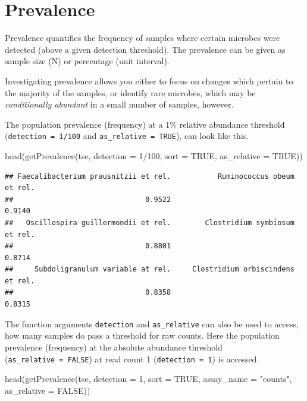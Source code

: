 \documentclass[
]{book}
\newenvironment{Shaded}{\begin{snugshade}}{\end{snugshade}}
\newcommand{\AttributeTok}[1]{\textcolor[rgb]{0.77,0.63,0.00}{#1}}
\newcommand{\ConstantTok}[1]{\textcolor[rgb]{0.00,0.00,0.00}{#1}}
\newcommand{\DecValTok}[1]{\textcolor[rgb]{0.00,0.00,0.81}{#1}}
\newcommand{\FunctionTok}[1]{\textcolor[rgb]{0.00,0.00,0.00}{#1}}
\newcommand{\NormalTok}[1]{#1}
\newcommand{\SpecialCharTok}[1]{\textcolor[rgb]{0.00,0.00,0.00}{#1}}
\newcommand{\StringTok}[1]{\textcolor[rgb]{0.31,0.60,0.02}{#1}}
\begin{document}
\hypertarget{prevalence}{%
\section{Prevalence}\label{prevalence}}

Prevalence quantifies the frequency of samples where certain microbes
were detected (above a given detection threshold). The prevalence can
be given as sample size (N) or percentage (unit interval).

Investigating prevalence allows you either to focus on changes which
pertain to the majority of the samples, or identify rare microbes,
which may be \emph{conditionally abundant} in a small number of samples,
however.

The population prevalence (frequency) at a 1\% relative abundance
threshold (\texttt{detection\ =\ 1/100} and \texttt{as\_relative\ =\ TRUE}), can look
like this.

\begin{Shaded}
\begin{Highlighting}[]
\FunctionTok{head}\NormalTok{(}\FunctionTok{getPrevalence}\NormalTok{(tse, }\AttributeTok{detection =} \DecValTok{1}\SpecialCharTok{/}\DecValTok{100}\NormalTok{, }\AttributeTok{sort =} \ConstantTok{TRUE}\NormalTok{, }\AttributeTok{as\_relative =} \ConstantTok{TRUE}\NormalTok{))}
\end{Highlighting}
\end{Shaded}

\begin{verbatim}
## Faecalibacterium prausnitzii et rel.           Ruminococcus obeum et rel. 
##                               0.9522                               0.9140 
##   Oscillospira guillermondii et rel.        Clostridium symbiosum et rel. 
##                               0.8801                               0.8714 
##     Subdoligranulum variable at rel.     Clostridium orbiscindens et rel. 
##                               0.8358                               0.8315
\end{verbatim}

The function arguments \texttt{detection} and \texttt{as\_relative} can also be used
to access, how many samples do pass a threshold for raw counts. Here
the population prevalence (frequency) at the absolute abundance
threshold (\texttt{as\_relative\ =\ FALSE}) at read count 1 (\texttt{detection\ =\ 1}) is
accessed.

\begin{Shaded}
\begin{Highlighting}[]
\FunctionTok{head}\NormalTok{(}\FunctionTok{getPrevalence}\NormalTok{(tse, }\AttributeTok{detection =} \DecValTok{1}\NormalTok{, }\AttributeTok{sort =} \ConstantTok{TRUE}\NormalTok{, }\AttributeTok{assay\_name =} \StringTok{"counts"}\NormalTok{,}
                   \AttributeTok{as\_relative =} \ConstantTok{FALSE}\NormalTok{))}
\end{Highlighting}
\end{Shaded}
\end{document}
